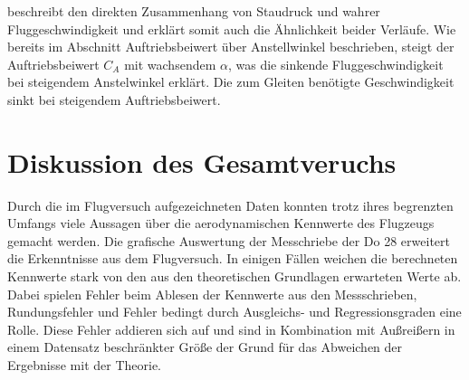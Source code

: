 beschreibt den direkten Zusammenhang von Staudruck und wahrer Fluggeschwindigkeit und erklärt somit auch die Ähnlichkeit beider Verläufe. Wie bereits im Abschnitt Auftriebsbeiwert über Anstellwinkel beschrieben, steigt der Auftriebsbeiwert $C_A$ mit wachsendem $\alpha$, was die sinkende Fluggeschwindigkeit bei steigendem Anstelwinkel erklärt. Die zum Gleiten benötigte Geschwindigkeit sinkt bei steigendem Auftriebsbeiwert. 

\section{Diskussion des Gesamtveruchs}

Durch die im Flugversuch aufgezeichneten Daten konnten trotz ihres begrenzten Umfangs viele Aussagen über die aerodynamischen Kennwerte des Flugzeugs gemacht werden. Die grafische Auswertung der Messchriebe der Do 28 erweitert die Erkenntnisse aus dem Flugversuch. In einigen Fällen weichen die berechneten Kennwerte stark von den aus den theoretischen Grundlagen erwarteten Werte ab. Dabei spielen Fehler beim Ablesen der Kennwerte aus den Messschrieben, Rundungsfehler und Fehler bedingt durch Ausgleichs- und Regressionsgraden eine Rolle. Diese Fehler addieren sich auf und sind in Kombination mit Außreißern in einem Datensatz beschränkter Größe der Grund für das Abweichen der Ergebnisse mit der Theorie. 




